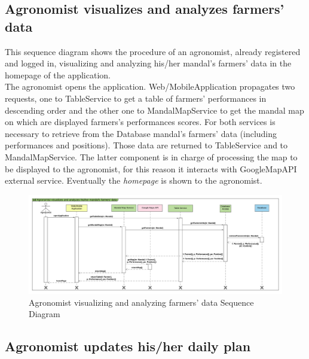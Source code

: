 \subsection{Agronomist visualizes and analyzes farmers' data}

This sequence diagram shows the procedure of an agronomist, already registered and logged in, visualizing and analyzing his/her mandal's farmers' data in the homepage of the application.\\
The agronomist opens the application. 
Web/MobileApplication propagates two requests, one to TableService to get a table of farmers' performances in descending order and the other one to MandalMapService to get the mandal map on which are displayed farmers's performances scores. For both services is necessary to retrieve from the Database mandal's farmers' data (including performances and positions). Those data are returned to TableService and to MandalMapService. The latter component is in charge of processing the map to be displayed to the agronomist, for this reason it interacts with GoogleMapAPI external service.
Eventually the \textit{homepage} is shown to the agronomist.

\newpage
\begin{landscape}
\begin{figure}[h]
\vspace*{-2cm}
\noindent
\centering
\centerline{\includegraphics[scale= 0.108]{./Images/Sequence diagram/Agronomist visualizes and analyzes his_her mandal's farmers' data.png}}
    \caption{Agronomist visualizing and analyzing farmers' data Sequence Diagram}
    \vspace*{-12cm}
\end{figure}
\fillandplacepagenumber
\end{landscape}

\subsection{Agronomist updates his/her daily plan}


